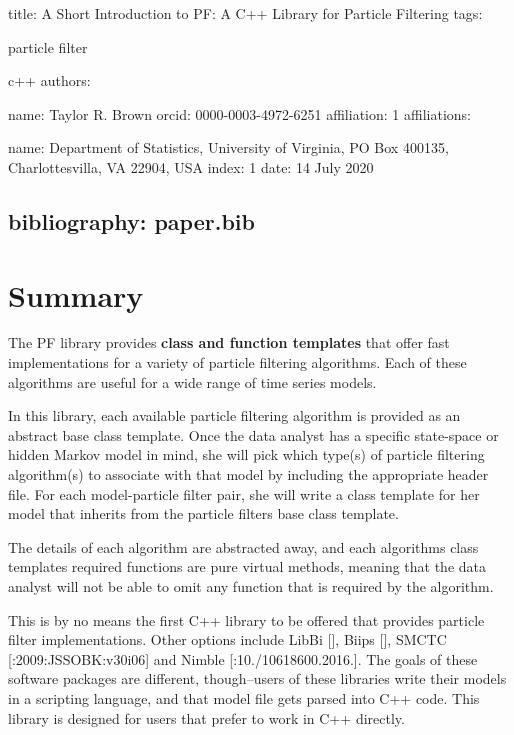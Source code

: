 

 title\+: \textquotesingle{}A Short Introduction to PF\+: A C++ Library for Particle Filtering\textquotesingle{} tags\+:
\begin{DoxyItemize}
\item particle filter
\item c++ authors\+:
\item name\+: Taylor R. Brown orcid\+: 0000-\/0003-\/4972-\/6251 affiliation\+: 1 affiliations\+:
\end{DoxyItemize}

name\+: Department of Statistics, University of Virginia, PO Box 400135, Charlottesvilla, VA 22904, U\+SA index\+: 1 date\+: 14 July 2020 \subsection*{bibliography\+: paper.\+bib }

\section*{Summary}

The {\ttfamily PF} library provides {\bfseries class and function templates} that offer fast implementations for a variety of particle filtering algorithms. Each of these algorithms are useful for a wide range of time series models.

In this library, each available particle filtering algorithm is provided as an abstract base class template. Once the data analyst has a specific state-\/space or hidden Markov model in mind, she will pick which type(s) of particle filtering algorithm(s) to associate with that model by including the appropriate header file. For each model-\/particle filter pair, she will write a class template for her model that inherits from the particle filter\textquotesingle{}s base class template.

The details of each algorithm are abstracted away, and each algorithm\textquotesingle{}s class template\textquotesingle{}s required functions are pure virtual methods, meaning that the data analyst will not be able to omit any function that is required by the algorithm.

This is by no means the first {\ttfamily C++} library to be offered that provides particle filter implementations. Other options include {\ttfamily Lib\+Bi} \mbox{[}\mbox{]}, {\ttfamily Biips} \mbox{[}\mbox{]}, {\ttfamily S\+M\+C\+TC} \mbox{[}\+:2009\+:J\+S\+S\+O\+BK\+:v30i06\mbox{]} and {\ttfamily Nimble} \mbox{[}\+:10./10618600.2016.\mbox{]}. The goals of these software packages are different, though--users of these libraries write their models in a scripting language, and that model file gets parsed into {\ttfamily C++} code. This library is designed for users that prefer to work in {\ttfamily C++} directly.

